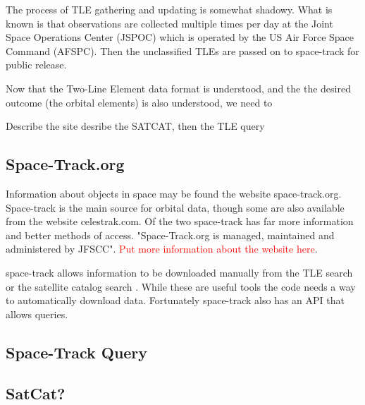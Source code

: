 \documentclass[12pt]{report}
\begin{document}
	The process of TLE gathering and updating is somewhat shadowy. \cite{vallado2012two} What is known is that observations are collected multiple times per day at the Joint
	Space Operations Center (JSPOC) which is operated by the US Air Force Space Command (AFSPC). Then the unclassified TLEs are passed on to space-track for public release.
	
	
	Now that the Two-Line Element data format is understood, and the the desired outcome (the orbital elements) is also understood, we need to 
	
	Describe the site
	desribe the SATCAT, then the TLE query
	
		\subsection{Space-Track.org}
	Information about objects in space may be found the website space-track.org. Space-track is the main source for orbital data, though some are also available from the website celestrak.com. Of the two space-track has far more information and better methods of access.  "Space-Track.org is managed, maintained and administered by JFSCC"\cite{SpaceTrackLegend}.   \textcolor{red}{Put more information about the website here}.\par 
	space-track allows information to be downloaded manually from the TLE search \cite{SpaceTrackTLE} or the satellite catalog search \cite{SpaceTrackSATCAT}. While these are useful tools the code needs a way to automatically download data. Fortunately space-track also has an API that allows queries. 
	\subsection{Space-Track Query}
	\subsection{SatCat?}
	
	
	
	
\end{document}
